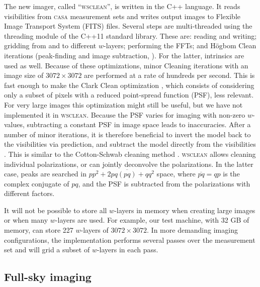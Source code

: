 \documentclass[useAMS,usenatbib]{mn2e}
\begin{document}
The new imager, called ``\textsc{wsclean}'', is written in the C++ language. It reads visibilities from \textsc{casa} measurement sets and writes output images to Flexible Image Transport System (FITS) files. Several steps are multi-threaded using the threading module of the C++11 standard library. These are: reading and writing; gridding from and to different $w$-layers; performing the FFTs; and H\"ogbom Clean iterations (peak-finding and image subtraction, \citealt{hogbom-clean}). For the latter, intrinsics are used as well. Because of these optimizations, minor Cleaning iterations with an image size of $3072\times3072$ are performed at a rate of hundreds per second. This is fast enough to make the Clark Clean optimization \citep{clark-clean}, which consists of considering only a subset of pixels with a reduced point-spread function (PSF), less relevant. For very large images this optimization might still be useful, but we have not implemented it in \textsc{wsclean}. Because the PSF varies for imaging with non-zero $w$-values, subtracting a constant PSF in image space leads to inaccuracies. After a number of minor iterations, it is therefore beneficial to invert the model back to the visibilities via prediction, and subtract the model directly from the visibilities \citep{wprojection-cornwell}. This is similar to the Cotton-Schwab cleaning method \citep{cotton-schwab-clean}. \textsc{wsclean} allows cleaning individual polarizations, or can jointly deconvolve the polarizations. In the latter case, peaks are searched in $pp^2+2pq \overline{(pq)} + qq^2$ space, where $\overline{pq}=qp$ is the complex conjugate of $pq$, and the PSF is subtracted from the polarizations with different factors.

It will not be possible to store all $w$-layers in memory when creating large images or when many $w$-layers are used. For example, our test machine, with 32 GB of memory, can store 227 $w$-layers of $3072\times3072$. In more demanding imaging configurations, the implementation performs several passes over the measurement set and will grid a subset of $w$-layers in each pass.

\subsection{Full-sky imaging}
\end{document}
